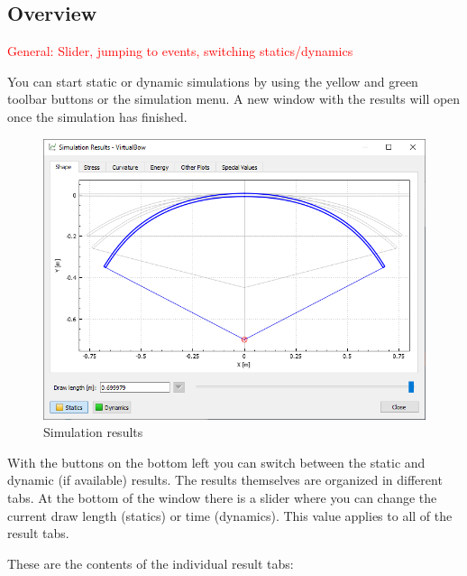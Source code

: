 \documentclass[12pt]{article}
\begin{document}
\subsection{Overview}

\textcolor{red}{General: Slider, jumping to events, switching statics/dynamics}

You can start static or dynamic simulations by using the yellow and green toolbar buttons or the simulation menu.
A new window with the results will open once the simulation has finished.

\begin{figure}[H]
\centering
\includegraphics[width=\textwidth]{figures/screenshots/output/result-window}
\caption{Simulation results}
\label{fig:result-window}
\end{figure}

With the buttons on the bottom left you can switch between the static and dynamic (if available) results.
The results themselves are organized in different tabs.
At the bottom of the window there is a slider where you can change the current draw length (statics) or time (dynamics).
This value applies to all of the result tabs.

\newpage
These are the contents of the individual result tabs:
\end{document}
